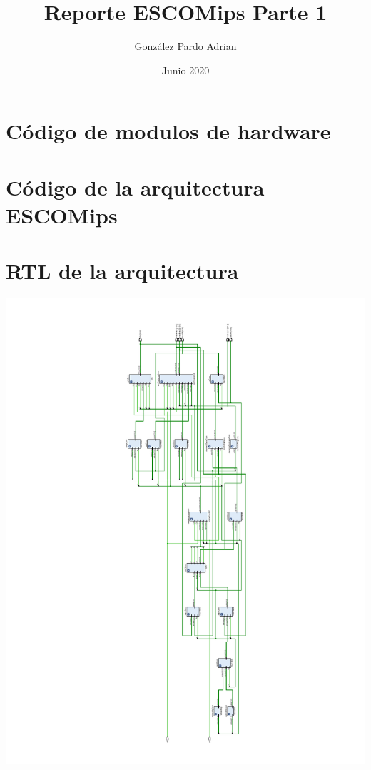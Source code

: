 \documentclass[8pt,executivepaper]{article}
\author{González Pardo Adrian}
\date{Junio 2020}
\title{Reporte ESCOMips Parte 1}
\begin{document}
\maketitle
\section{Código de modulos de hardware}
\begin{center}
  
\end{center}
\section{Código de la arquitectura ESCOMips}
\begin{center}
  
\end{center}
\clearpage
\section{RTL de la arquitectura}
\begin{center}
  \includegraphics[scale=0.75]{rtl/escomips.pdf}
\end{center}
\end{document}
